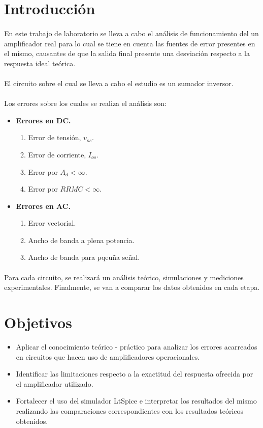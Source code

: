 \newpage
\section{Introducción}
\paragraph{}
En este trabajo de laboratorio se lleva a cabo el análisis de funcionamiento del un amplificador real para lo cual se tiene en cuenta las fuentes de error presentes en el mismo, causantes de que la salida final presente una desviación respecto a la respuesta ideal teórica.
\paragraph{}
El circuito sobre el cual se lleva a cabo el estudio es un sumador inversor. 
\paragraph{}
Los errores sobre los cuales se realiza el análisis son:
\begin{itemize}
    \item \textbf{Errores en DC.}
    \begin{enumerate}
	\item Error de tensión, $v_{os}$.
	\item Error de corriente, $I_{os}$.
	\item Error por $A_d<\infty$.
        \item Error por $RRMC<\infty$.
    \end{enumerate}
    \item \textbf{Errores en AC.}
    \begin{enumerate}
        \item Error vectorial.
        \item Ancho de banda a plena potencia.
        \item Ancho de banda para pqeuña señal.
    \end{enumerate}
\end{itemize}
\paragraph{}
Para cada circuito, se realizará un análisis teórico, simulaciones y mediciones experimentales. Finalmente, se van a comparar los datos obtenidos en cada etapa.

\section{Objetivos}
\begin{itemize}
	\item Aplicar el conocimiento teórico - práctico para analizar los errores acarreados en circuitos que hacen uso de amplificadores operacionales.
        \item Identificar las limitaciones respecto a la exactitud del respuesta ofrecida por el amplificador utilizado.
	\item Fortalecer el uso del simulador LtSpice e interpretar los resultados del mismo realizando las comparaciones correspondientes con los resultados teóricos obtenidos.
\end{itemize}
